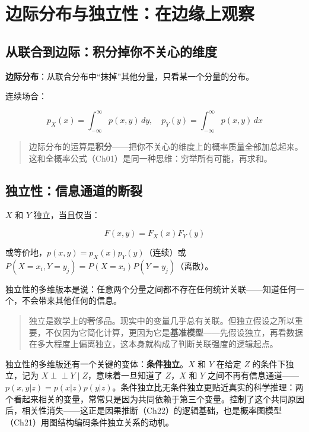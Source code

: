 \documentclass[
]{book}
\begin{document}
\section{边际分布与独立性：在边缘上观察}\label{ux8fb9ux9645ux5206ux5e03ux4e0eux72ecux7acbux6027ux5728ux8fb9ux7f18ux4e0aux89c2ux5bdf}

\subsection{从联合到边际：积分掉你不关心的维度}\label{ux4eceux8054ux5408ux5230ux8fb9ux9645ux79efux5206ux6389ux4f60ux4e0dux5173ux5fc3ux7684ux7ef4ux5ea6}

\textbf{边际分布}：从联合分布中``抹掉''其他分量，只看某一个分量的分布。

连续场合：

\[p_X(x) = \int_{-\infty}^{\infty} p(x,y) \, dy, \quad p_Y(y) = \int_{-\infty}^{\infty} p(x,y) \, dx\]

\begin{quote}
边际分布的运算是\textbf{积分}------把你不关心的维度上的概率质量全部加总起来。这和全概率公式（Ch01）是同一种思维：穷举所有可能，再求和。
\end{quote}

\subsection{独立性：信息通道的断裂}\label{ux72ecux7acbux6027ux4fe1ux606fux901aux9053ux7684ux65adux88c2-1}

\(X\) 和 \(Y\) 独立，当且仅当：

\[F(x,y) = F_X(x) F_Y(y)\]

或等价地，\(p(x,y) = p_X(x) p_Y(y)\)（连续）或 \(P(X=x_i, Y=y_j) = P(X=x_i) P(Y=y_j)\)（离散）。

独立性的多维版本是说：任意两个分量之间都不存在任何统计关联------知道任何一个，不会带来其他任何的信息。

\begin{quote}
独立是数学上的奢侈品。现实中的变量几乎总有关联。但独立假设之所以重要，不仅因为它简化计算，更因为它是\textbf{基准模型}------先假设独立，再看数据在多大程度上偏离独立，这本身就构成了判断关联强度的逻辑起点。
\end{quote}

独立性的多维版还有一个关键的变体：\textbf{条件独立}。\(X\) 和 \(Y\) 在给定 \(Z\) 的条件下独立，记为 \(X \perp\!\!\!\perp Y \mid Z\)，意味着一旦知道了 \(Z\)，\(X\) 和 \(Y\) 之间不再有信息通道------\(p(x,y|z) = p(x|z)p(y|z)\)。条件独立比无条件独立更贴近真实的科学推理：两个看起来相关的变量，常常只是因为共同依赖于第三个变量。控制了这个共同原因后，相关性消失------这正是因果推断（Ch22）的逻辑基础，也是概率图模型（Ch21）用图结构编码条件独立关系的动机。
\end{document}

